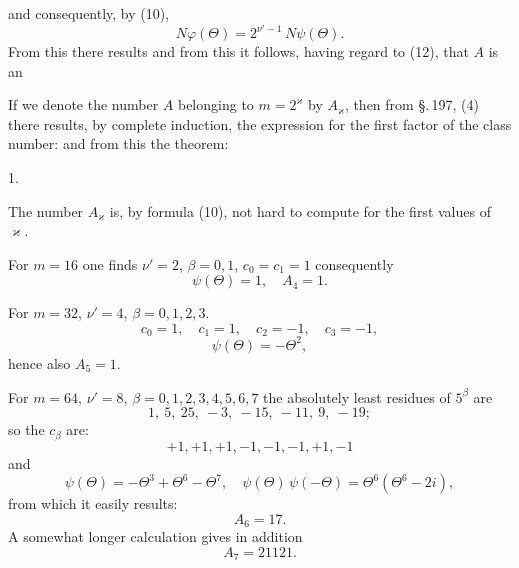 and consequently, by (10),
\[
N\varphi(\Theta) = 2^{\nu'-1}\,N\psi(\Theta).
\]
From this there results
and from this it follows, having regard to (12), that $A$ is an 

If we denote the number $A$ belonging to $m = 2^\varkappa$ by $A_\varkappa$, then
from \S.\,197, (4) there results, by complete induction, the
expression for the first factor of the class number:
and from this the theorem:

1. 

The number $A_\varkappa$ is, by formula (10), not hard to compute for the
first values of $\varkappa$.

For $m = 16$ one finds $\nu' = 2$, $\beta = 0, 1$, $c_0 = c_1 = 1$
consequently
\[
\psi(\Theta) = 1, \quad A_4 = 1.
\]

For $m = 32$, $\nu' = 4$, $\beta = 0, 1, 2, 3$.
\[
c_0 = 1, \quad c_1 = 1, \quad c_2 = -1, \quad c_3 = -1,
\]
\[
\psi(\Theta) = -\Theta^2,
\]
hence also $A_5 = 1$.

For $m = 64$, $\nu' = 8$, $\beta = 0, 1, 2, 3, 4, 5, 6, 7$ the
absolutely least residues of $5^\beta$ are
\[
1,\ 5,\ 25,\ -3,\ -15,\ -11,\ 9,\ -19;
\]
so the $c_\beta$ are:
\[
+1, +1, +1, -1, -1, -1, +1, -1
\]
and
\[
\psi(\Theta) = -\Theta^3 + \Theta^6 - \Theta^7, \quad \psi(\Theta)\,\psi(-\Theta) = \Theta^6(\Theta^6 - 2i),
\]
from which it easily results:
\[
A_6 = 17.
\]
A somewhat longer calculation gives in addition
\[
A_7 = 21121.
\]
